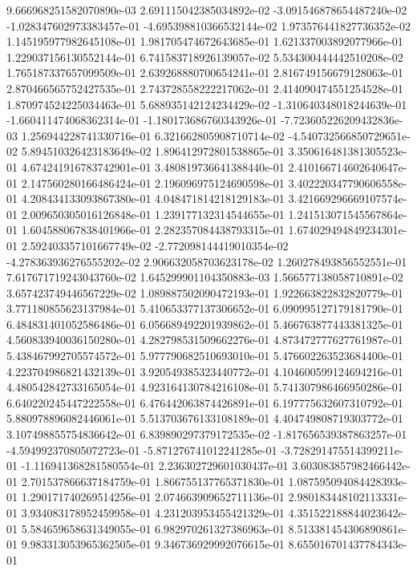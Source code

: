 9.666968251582070890e-03
2.691115042385034892e-02
-3.091546878654487240e-02
-1.028347602973383457e-01
-4.695398810366532144e-02
1.973576441827736352e-02
1.145195977982645108e-01
1.981705474672643685e-01
1.621337003892077966e-01
1.229037156130552144e-01
6.741583718926139057e-02
5.534300444442510208e-02
1.765187337657099509e-01
2.639268880700654241e-01
2.816749156679128063e-01
2.870466565752427535e-01
2.743728558222217062e-01
2.414090474551254528e-01
1.870974524225034463e-01
5.688935142124234429e-02
-1.310640348018244639e-01
-1.660411474068362314e-01
-1.180173686760343926e-01
-7.723605226209432836e-03
1.256944228741330716e-01
6.321662805908710714e-02
-4.540732566850729651e-02
5.894510326423183649e-02
1.896412972801538865e-01
3.350616481381305523e-01
4.674241916783742901e-01
3.480819736641388440e-01
2.410166714602640647e-01
2.147560280166486424e-01
2.196096975124690598e-01
3.402220347790606558e-01
4.208434133093867380e-01
4.048471814218129183e-01
3.421669296669107574e-01
2.009650305016126848e-01
1.239177132314544655e-01
1.241513071545567864e-01
1.604588067838401966e-01
2.282357084438793315e-01
1.674029494849234301e-01
2.592403357101667749e-02
-2.772098144419010354e-02
-4.278363936276555202e-02
2.906632058703623178e-02
1.260278493856552551e-01
7.617671719243043760e-02
1.645299901104350883e-03
1.566577138058710891e-02
3.657423749446567229e-02
1.089887502090472193e-01
1.922663822832820779e-01
3.771180855623137984e-01
5.410653377137306652e-01
6.090995127179181790e-01
6.484831401052586486e-01
6.056689492201939862e-01
5.466763877443381325e-01
4.560833940036150280e-01
4.282798531509662276e-01
4.873472777627761987e-01
5.438467992705574572e-01
5.977790682510693010e-01
5.476602263523684400e-01
4.223704986821432139e-01
3.920549385323440772e-01
4.104600599124694216e-01
4.480542842733165054e-01
4.923164130784216108e-01
5.741307986466950286e-01
6.640220245447222558e-01
6.476442063874426891e-01
6.197775632607310792e-01
5.880978896082446061e-01
5.513703676133108189e-01
4.404749808719303772e-01
3.107498855754836642e-01
6.839890297379172535e-02
-1.817656539387863257e-01
-4.594992370805072723e-01
-5.871276741012241285e-01
-3.728291475514399211e-01
-1.116941368281580554e-01
2.236302729601030437e-01
3.603083857982466442e-01
2.701537866637184759e-01
1.866755137765371830e-01
1.087595094084428393e-01
1.290171740269514256e-01
2.074663909652711136e-01
2.980183448102113331e-01
3.934083178952459958e-01
4.231203953455421329e-01
4.351522188844023642e-01
5.584659658631349055e-01
6.982970261327386963e-01
8.513381454306890861e-01
9.983313053965362505e-01
9.346736929992076615e-01
8.655016701437784343e-01

